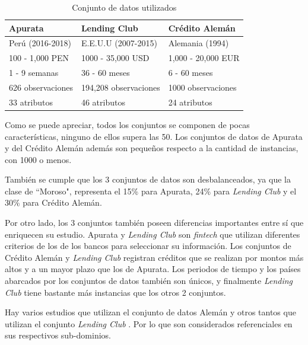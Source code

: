 \begin{table}
    \centering
    \caption{Conjunto de datos utilizados}
    \label{tab:dataset-comparison}
    \begin{tabular}{@{}lll@{}}
    \toprule
    \textbf{Apurata}    & \textbf{Lending Club}     & \textbf{Crédito Alemán}   \\
    \midrule
    Perú (2016-2018)    & E.E.U.U (2007-2015)       & Alemania (1994)           \\
    100 - 1,000 PEN     & 1000 - 35,000 USD         & 1,000 - 20,000 EUR        \\
    1 - 9 semanas       & 36 - 60 meses             & 6 - 60 meses              \\
    626 observaciones   & 194,208 observaciones     & 1000 observaciones        \\
    33 atributos        & 46 atributos              & 24 atributos              \\
    \bottomrule
    \end{tabular}
\end{table}

Como se puede apreciar, todos los conjuntos se componen de pocas características, ninguno de ellos supera las 50. Los conjuntos de datos de Apurata y del Crédito Alemán además son pequeños respecto a la cantidad de instancias, con 1000 o menos.

También se cumple que los 3 conjuntos de datos son desbalanceados, ya que la clase de ``Moroso", representa el 15\% para Apurata, 24\% para \textit{Lending Club} y el 30\% para Crédito Alemán.

Por otro lado, los 3 conjuntos también poseen diferencias importantes entre sí que enriquecen su estudio. Apurata y \textit{Lending Club} son \textit{fintech} que utilizan diferentes criterios de los de los bancos para seleccionar su información. Los conjuntos de Crédito Alemán y \textit{Lending Club} registran créditos que se realizan por montos más altos y a un mayor plazo que los de Apurata. Los periodos de tiempo y los países abarcados por los conjuntos de datos también son únicos, y finalmente \textit{Lending Club} tiene bastante más instancias que los otros 2 conjuntos.

Hay varios estudios que utilizan el conjunto de datos Alemán \citep{harris2015credit, nanni2009experimental, brown2012experimental, wang2012two} y otros tantos que utilizan el conjunto \textit{Lending Club} \citep{malekipirbazari2015risk, zhang2016research, zang2014credit, tan2018deep}. Por lo que son considerados referenciales en sus respectivos sub-dominios.

